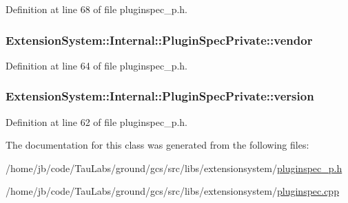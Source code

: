 \-Definition at line 68 of file pluginspec\-\_\-p.\-h.

\hypertarget{class_extension_system_1_1_internal_1_1_plugin_spec_private_a3628c7ebcd80e71dd74fc0df729aac7a}{
\subsubsection[{vendor}]{ {\bf \-Extension\-System\-::\-Internal\-::\-Plugin\-Spec\-Private\-::vendor}}}\label{class_extension_system_1_1_internal_1_1_plugin_spec_private_a3628c7ebcd80e71dd74fc0df729aac7a}


\-Definition at line 64 of file pluginspec\-\_\-p.\-h.

\hypertarget{class_extension_system_1_1_internal_1_1_plugin_spec_private_a00cf7a310301d427a56b1b23576289bc}{
\subsubsection[{version}]{ {\bf \-Extension\-System\-::\-Internal\-::\-Plugin\-Spec\-Private\-::version}}}\label{class_extension_system_1_1_internal_1_1_plugin_spec_private_a00cf7a310301d427a56b1b23576289bc}


\-Definition at line 62 of file pluginspec\-\_\-p.\-h.



\-The documentation for this class was generated from the following files\-:\begin{DoxyCompactItemize}
\item 
/home/jb/code/\-Tau\-Labs/ground/gcs/src/libs/extensionsystem/\hyperlink{pluginspec__p_8h}{pluginspec\-\_\-p.\-h}\item 
/home/jb/code/\-Tau\-Labs/ground/gcs/src/libs/extensionsystem/\hyperlink{pluginspec_8cpp}{pluginspec.\-cpp}\end{DoxyCompactItemize}

